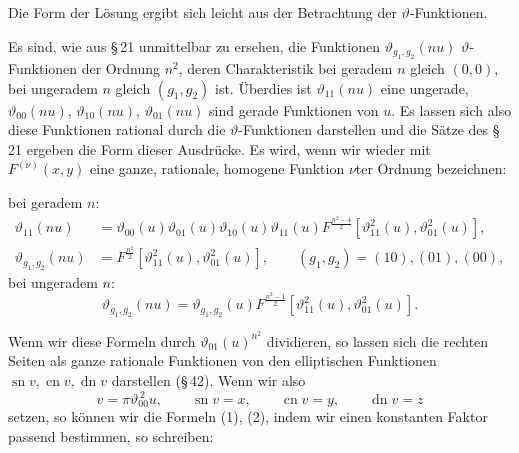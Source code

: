 \documentclass[11pt]{article}
\providecommand{\sn}{\operatorname{sn}}
\providecommand{\cn}{\operatorname{cn}}
\providecommand{\dn}{\operatorname{dn}}
\begin{document}
Die Form der Lösung ergibt sich leicht aus der Betrachtung der $\vartheta$-Funktionen.

Es sind, wie aus \S\,21 unmittelbar zu ersehen, die Funktionen
$\vartheta_{g_1,g_2}(n u)$ $\vartheta$-Funktionen der Ordnung $n^2$, deren Charakteristik
bei geradem $n$ gleich $(0,0)$, bei ungeradem $n$ gleich $(g_1,g_2)$ ist. Überdies ist
$\vartheta_{11}(nu)$ eine ungerade, $\vartheta_{00}(nu)$, $\vartheta_{10}(nu)$,
$\vartheta_{01}(nu)$ sind gerade Funktionen von $u$. Es lassen sich also diese Funktionen
rational durch die $\vartheta$-Funktionen darstellen und die Sätze des \S\,21 ergeben die Form
dieser Ausdrücke. Es wird, wenn wir wieder mit $F^{(\nu)}(x,y)$ eine ganze, rationale,
homogene Funktion $\nu$ter Ordnung bezeichnen:

bei geradem $n$:
\begin{equation}
\begin{aligned}
\vartheta_{11}(nu)
&=\vartheta_{00}(u)\vartheta_{01}(u)\vartheta_{10}(u)\vartheta_{11}(u)
 F^{\frac{n^2-4}{2}}\!\left[\vartheta_{11}^2(u),\vartheta_{01}^2(u)\right],\\
\vartheta_{g_1,g_2}(nu)
&=F^{\frac{n^2}{2}}\!\left[\vartheta_{11}^2(u),\vartheta_{01}^2(u)\right],
\qquad (g_1,g_2)=(10),(01),(00),
\end{aligned}
\tag{1}
\end{equation}
bei ungeradem $n$:
\begin{equation}
\vartheta_{g_1,g_2}(nu)
=\vartheta_{g_1,g_2}(u)F^{\frac{n^2-1}{2}}\!\left[\vartheta_{11}^2(u),\vartheta_{01}^2(u)\right].
\tag{2}
\end{equation}

Wenn wir diese Formeln durch $\vartheta_{01}(u)^{n^2}$ dividieren, so lassen sich die
rechten Seiten als ganze rationale Funktionen von den elliptischen Funktionen
$\sn v,\cn v,\dn v$ darstellen (\S\,42). Wenn wir also
\begin{equation}
v=\pi\vartheta_{00}^{\,2}u,\qquad \sn v=x,\qquad \cn v=y,\qquad \dn v=z
\tag{3}
\end{equation}
setzen, so können wir die Formeln (1), (2), indem wir einen konstanten Faktor passend
bestimmen, so schreiben:
\end{document}
